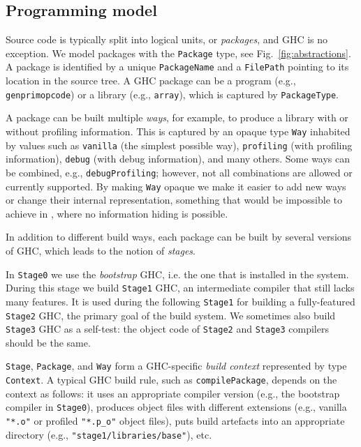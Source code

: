 \subsection{Programming model}

Source code is typically split into logical units, or \emph{packages},
and GHC is no exception. We model packages with the \texttt{Package}
type, see Fig.~\ref{fig:abstractions}. A package is identified by a unique
\texttt{PackageName} and a \texttt{FilePath} pointing to its location in the
source tree. A GHC package can be a program (e.g., \texttt{genprimopcode}) or a
library (e.g., \texttt{array}), which is captured by \texttt{PackageType}.

A package can be built multiple \emph{ways}, for example, to produce a library
with or without profiling information. This is captured by an opaque
type \texttt{Way} inhabited by values such as \texttt{vanilla} (the simplest
possible way), \texttt{profiling} (with profiling information), \texttt{debug} (with
debug information), and many others. Some ways can be combined, e.g.,
\texttt{debugProfiling}; however, not all combinations are allowed or currently
supported. By making \texttt{Way} opaque we make it easier to add new ways
or change their internal representation, something that would be
impossible to achieve in \make{}, where no information hiding is
possible.

In addition to different build ways, each package can be built by several
versions of GHC, which leads to the notion of \emph{stages}.

In \texttt{Stage0} we use the \emph{bootstrap} GHC, i.e. the one that is
installed in the system. During this stage we build \texttt{Stage1} GHC, an
intermediate compiler that still lacks many features. It is used during the
following \texttt{Stage1} for building a fully-featured \texttt{Stage2} GHC, the
primary goal of the build system. We sometimes also build \texttt{Stage3} GHC as
a self-test: the object code of \texttt{Stage2} and \texttt{Stage3} compilers
should be the same.

\texttt{Stage}, \texttt{Package}, and \texttt{Way} form a GHC-specific
\emph{build context} represented by type \texttt{Context}. A typical GHC build
rule, such as \texttt{compilePackage}, depends on the context as follows: it
uses an appropriate compiler version (e.g., the bootstrap compiler in
\texttt{Stage0}), produces object files with different extensions (e.g.,
vanilla \texttt{"*.o"} or profiled \texttt{"*.p\_o"} object files), puts build
artefacts into an appropriate directory (e.g.,
\texttt{"stage1/libraries/base"}), etc.

